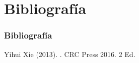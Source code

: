 \documentclass[11pt]{beamer}					%
\begin{document}
\section{Bibliografía}
  	\begin{frame}
 		\frametitle{Bibliografía}
\begin{thebibliography}{}

Yihui Xie (2013).
.
\newblock CRC Press 2016. 2 Ed.

\end{thebibliography}

       	\end{frame}
\end{document}
